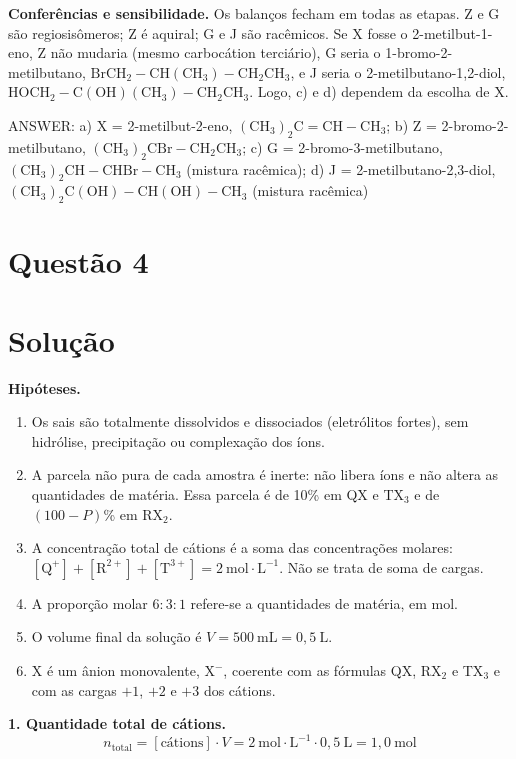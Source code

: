 \documentclass{article}%
\begin{document}
\textbf{Conferências e sensibilidade.} Os balanços fecham em todas as etapas. Z e G são regiosisômeros; Z é aquiral; G e J são racêmicos. Se X fosse o 2-metilbut-1-eno, Z não mudaria (mesmo carbocátion terciário), G seria o 1-bromo-2-metilbutano, $\mathrm{BrCH_2{-}CH(CH_3){-}CH_2CH_3}$, e J seria o 2-metilbutano-1,2-diol, $\mathrm{HOCH_2{-}C(OH)(CH_3){-}CH_2CH_3}$. Logo, c) e d) dependem da escolha de X.

ANSWER: a) X = 2-metilbut-2-eno, $(\mathrm{CH_3})_2\mathrm{C{=}CH{-}CH_3}$; b) Z = 2-bromo-2-metilbutano, $(\mathrm{CH_3})_2\mathrm{CBr{-}CH_2CH_3}$; c) G = 2-bromo-3-metilbutano, $(\mathrm{CH_3})_2\mathrm{CH{-}CHBr{-}CH_3}$ (mistura racêmica); d) J = 2-metilbutano-2,3-diol, $(\mathrm{CH_3})_2\mathrm{C(OH){-}CH(OH){-}CH_3}$ (mistura racêmica)%
\newpage%
\section*{Questão 4}

\section*{Solução}

\textbf{Hipóteses.}
\begin{enumerate}
\item Os sais são totalmente dissolvidos e dissociados (eletrólitos fortes), sem hidrólise, precipitação ou complexação dos íons.
\item A parcela não pura de cada amostra é inerte: não libera íons e não altera as quantidades de matéria. Essa parcela é de 10\% em QX e TX$_3$ e de $(100-P)$\% em RX$_2$.
\item A concentração total de cátions é a soma das concentrações molares: $[\mathrm{Q}^{+}]+[\mathrm{R}^{2+}]+[\mathrm{T}^{3+}]=2\ \mathrm{mol\cdot L^{-1}}$. Não se trata de soma de cargas.
\item A proporção molar $6:3:1$ refere-se a quantidades de matéria, em mol.
\item O volume final da solução é $V=500\ \mathrm{mL}=0{,}5\ \mathrm{L}$.
\item X é um ânion monovalente, $\mathrm{X}^{-}$, coerente com as fórmulas QX, RX$_2$ e TX$_3$ e com as cargas $+1$, $+2$ e $+3$ dos cátions.
\end{enumerate}

\textbf{1. Quantidade total de cátions.}
\[
n_{\mathrm{total}}=[\text{cátions}]\cdot V=2\ \mathrm{mol\cdot L^{-1}}\cdot 0{,}5\ \mathrm{L}=1{,}0\ \mathrm{mol}
\]
\end{document}
